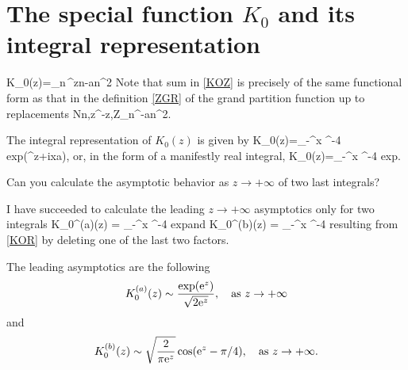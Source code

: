 \pagebreak
\section{The special function $K_0$ and its integral representation}

\be\label{KOZ}
K_0(z)=\sum_{n}\,\e^{zn-an^2}
\ee
Note that sum in \eqref{KOZ} is precisely of the same functional form as that in the definition \eqref{ZGR} of the grand partition function up to replacements
\be
N\to n,\qquad z\to\e^{-z},Z_n\to\e^{-an^2}.
\ee

The integral representation of $K_0(z)$ is given by
\be\label{KOI}
K_0(z)=\int_{-\infty}^x \e^{-4}
\mbox{exp}\left(\e^{z+ix\sqrt a}\right),
\ee
or, in the form of a manifestly real integral,
\be\label{KOR}
K_0(z)=\int_{-\infty}^x \e^{-4}
\mbox{exp}
\cos{}.
\ee

Can you calculate the asymptotic behavior as $z\to+\infty$ of two last integrals?

I have succeeded to calculate the leading $z\to+\infty$ asymptotics only for two integrals
\be
K_0^{(a)}(z) =  \int_{-\infty}^x \e^{-4}
\mbox{exp}\qquad\mbox{and}\qquad
\ee
\be
K_0^{(b)}(z) =  \int_{-\infty}^x \e^{-4}
\cos{}
\ee
resulting from \eqref{KOR} by deleting one of the last two factors.

The leading asymptotics are the following
\begin{equation}
	K_0^{(a)}(z) \sim \frac{\exp({\rm e}^z)}{\sqrt{2 {\rm e}^z}}, \quad \text{as } z \to +\infty
\end{equation}
and
\begin{equation}
	K_0^{(b)}(z) \sim \sqrt{\frac{2}{\pi {\rm e}^z}} \cos({\rm e}^z - \pi/4), \quad \text{as } z \to +\infty.
\end{equation}